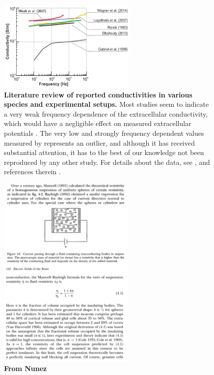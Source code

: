 \begin{figure}[!ht]
\begin{center}
\includegraphics[width=0.6\textwidth]{Figures/Sigma/frequency_dependence.png}
\end{center}
\caption{\textbf{Literature review of reported conductivities in various species and experimental setups.} 
Most studies seem to indicate a very weak frequency dependence of the extracellular conductivity, which would have a negligible effect on measured extracellular potentials \citep{Miceli2017}. The very low and strongly frequency dependent values measured by \citep{Gabriel1996} represents an outlier, and although it has received substantial attention, it has to the best of our knowledge not been reproduced by any other study. For details about the data, see \citep{Miceli2017}, and references therein \citep{Ranck1963, Gabriel1996, Logothetis2007, Elbohouty2013, Wagner2014}.
}
\label{Sigma:fig:freq_dep}
\end{figure}



\begin{figure}[!ht]
\begin{center}
\includegraphics[width=0.6\textwidth]{Figures/Sigma/resistivity_maxwell.png}
\end{center}
\caption{\textbf{From Nunez} }
\label{Sigma:fig:maxwell_resistivity}
\end{figure}

